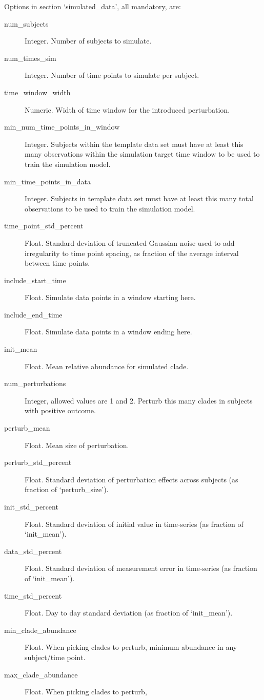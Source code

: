 \documentclass[12pt]{report}
\begin{document}
Options in section `simulated\_data', all mandatory, are:
\begin{description}
\item[num\_subjects] Integer. Number of subjects to simulate.
\item[num\_times\_sim ] Integer. Number of time points to simulate per subject.
\item[time\_window\_width ] Numeric. Width of time window for the
  introduced perturbation.
\item[min\_num\_time\_points\_in\_window] Integer. Subjects within the
  template data set must have at least this many observations within
  the simulation target time window to be used to train the simulation
  model.
\item[min\_time\_points\_in\_data ] Integer. Subjects in template data
  set must have at least this many total observations to be used to
  train the simulation model.
\item[time\_point\_std\_percent ] Float. Standard deviation of
  truncated Gaussian noise used to add irregularity to time point
  spacing, as fraction of the average interval between time points.
\item[include\_start\_time] Float. Simulate data points in a window
  starting here.
\item[include\_end\_time ] Float. Simulate data points in a window ending here.
\item[init\_mean ] Float. Mean relative abundance for simulated clade.
\item[num\_perturbations] Integer, allowed values are 1 and 2. Perturb
  this many clades in subjects with positive outcome.
\item[perturb\_mean] Float. Mean size of perturbation.
\item[perturb\_std\_percent] Float. Standard deviation of perturbation
  effects across subjects (as fraction of `perturb\_size').
\item[init\_std\_percent] Float. Standard deviation of initial value
  in time-series (as fraction of `init\_mean').
\item[data\_std\_percent] Float. Standard deviation of measurement error
  in time-series (as fraction of `init\_mean').
\item[time\_std\_percent] Float. Day to day standard deviation
  (as fraction of `init\_mean').
\item[min\_clade\_abundance] Float. When picking clades to perturb,
  minimum abundance in any subject/time point.
\item[max\_clade\_abundance ] Float. When picking clades to perturb,

\end{description}
\end{document}
